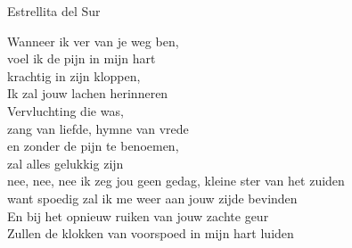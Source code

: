 \begin{song}[vals]{Estrellita del Sur}
\clearpage
\begin{translation}
Wanneer ik ver van je weg ben,\\
voel ik de pijn in mijn hart\\
krachtig in zijn kloppen,\\
Ik zal jouw lachen herinneren\\
Vervluchting die was,\\
zang van liefde, hymne van vrede\\
en zonder de pijn te benoemen,\\
zal alles gelukkig zijn\\
\vspace{1em}
nee, nee, nee ik zeg jou geen gedag, kleine ster van het zuiden\\
want spoedig zal ik me weer aan jouw zijde bevinden\\
En bij het opnieuw ruiken van jouw zachte geur\\
Zullen de klokken van voorspoed in mijn hart luiden\\
\end{translation}
\end{song}

